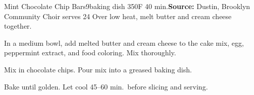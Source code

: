 \begin{recipe}{Mint Chocolate Chip Bars}{9\inch{}\inch baking dish \hfill 350\0F \hfill 40 min.}{\textbf{Source:} Dustin, Brooklyn Community Choir \hfill serves 24}
 Over low heat, melt butter and cream cheese together.

 In a medium bowl, add melted butter and cream cheese to the cake mix, egg, peppermint extract, and food coloring. Mix thoroughly.

 Mix in chocolate chips. Pour mix into a greased baking dish.

 \newstep Bake until golden. Let cool 45--60 min.\ before slicing and serving.
\end{recipe}
